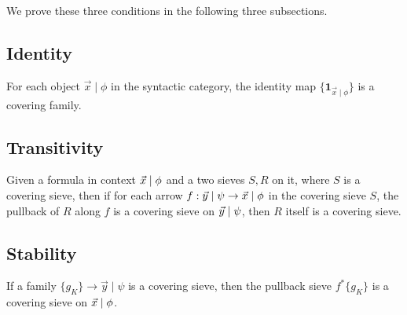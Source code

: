 We prove these three conditions in the following three subsections.
\subsection{Identity}
\begin{lemma}
  For each object $\vec{x}\mid \phi$ in the syntactic category, the identity map $\{\mathbf{1}_{\vec{x}\mid\phi}\}$ is a covering family.
\end{lemma}

\subsection{Transitivity}
\begin{lemma}[Transitivity]
  Given a formula in context $\vec{x}\mid\phi$ and a two sieves $S,R$ on it, where $S$ is a covering sieve, then if for each arrow $f:\vec{y}\mid\psi\to\vec{x}\mid\phi$ in the
  covering sieve $S$, the pullback of $R$ along $f$ is a covering sieve on $\vec{y}\mid\psi$, then $R$ itself is a covering sieve.
\end{lemma}



\subsection{Stability}



\begin{theorem}
  If a family $\{g_K\}\to \vec{y}\mid \psi$ is a covering sieve, then the pullback sieve $f^*\{g_K\}$ is a covering sieve on $\vec{x}\mid\phi$.
\end{theorem}

